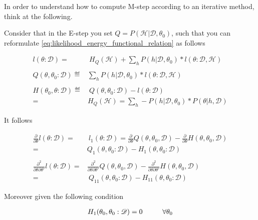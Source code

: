 \documentclass[11pt]{article}
\begin{document}
\begin{article}
In order to understand how to compute M-step according to an
iterative method, think at the following.

Consider that in the E-step you set \(Q = P (\mathscr{H}| \mathscr{D}, \theta_0)\), such
that you can reformulate
\ref{eq:likelihood_energy_functional_relation} as follows

\begin{align} \label{eq:likelihood_energy_iterative}
l (\theta: \mathscr{D}) =& \ H_Q (\mathscr {H}) + \sum_h P(h | \mathscr{D}, \theta_0) * l (\theta: \mathscr{D}, \mathscr{H}) \\
\nonumber\\
Q(\theta, \theta_0 : \mathscr{D}) \eqdef& \sum_h P(h | \mathscr{D}, \theta_0) * l (\theta: \mathscr{D}, \mathscr{H})\\
\nonumber\\  
H(\theta_0, \theta: \mathscr{D}) \eqdef& \ Q(\theta, \theta_0 : \mathscr{D}) - l (\theta: \mathscr{D}) \\
                                 =& H_Q (\mathscr {H}) = \sum_h - P(h | \mathscr{D}, \theta_0) * P(\theta | h, \mathscr{D}) \nonumber
\end{align}

It follows

\begin{align} 
\frac{\partial}{\partial \theta} l (\theta: \mathscr{D}) =& \ l_1 (\theta: \mathscr{D}) = \frac{\partial}{\partial \theta} Q(\theta, \theta_0, \mathscr{D}) - \frac{\partial}{\partial \theta} H(\theta, \theta_0, \mathscr{D}) \nonumber \\
=& Q_1(\theta, \theta_0 : \mathscr{D}) - H_1(\theta, \theta_0 : \mathscr{D})  \label{eq:m-condition-iterative1} \\
\nonumber \\
\frac{\partial^2}{\partial \theta \partial \theta'} l (\theta: \mathscr{D}) =& \frac{\partial^2}{\partial \theta \partial \theta'}  Q(\theta, \theta_0, \mathscr{D}) -  \frac{\partial^2}{\partial \theta \partial \theta'}  H(\theta, \theta_0, \mathscr{D}) \nonumber \\
  =& \ Q_{11}(\theta, \theta_0 : \mathscr{D}) - H_{11}(\theta, \theta_0 : \mathscr{D}) \label{eq:m-condition-iterative2}
\end{align}

Moreover given the following condition

\begin{align} 
 H_1(\theta_0, \theta_0 : \mathscr{D})  = 0 \hspace*{1cm} \forall \theta_0 \label{eq:m-condition-entropy-iterative}
\end{align}


\end{article}
\end{document}
